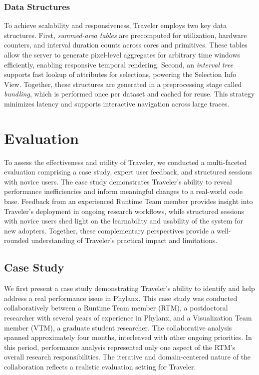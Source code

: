 \begin{refsection}
\subsubsection{Data Structures}

To achieve scalability and responsiveness, Traveler employs two key data structures. First, {\em summed-area tables} are precomputed for utilization, hardware counters, and interval duration counts across cores and primitives. These tables allow the server to generate pixel-level aggregates for arbitrary time windows efficiently, enabling responsive temporal rendering. Second, an {\em interval tree} supports fast lookup of attributes for selections, powering the Selection Info View. Together, these structures are generated in a preprocessing stage called {\em bundling}, which is performed once per dataset and cached for reuse. This strategy minimizes latency and supports interactive navigation across large traces.


\section{Evaluation}
\label{sec:travevaluation}

To assess the effectiveness and utility of Traveler, we conducted a multi-faceted evaluation comprising a case study, expert user feedback, and structured sessions with novice users. The case study demonstrates Traveler's ability to reveal performance inefficiencies and inform meaningful changes to a real-world code base. Feedback from an experienced Runtime Team member provides insight into Traveler's deployment in ongoing research workflows, while structured sessions with novice users shed light on the learnability and usability of the system for new adopters. Together, these complementary perspectives provide a well-rounded understanding of Traveler's practical impact and limitations.

\subsection{Case Study}
\label{subsec:casestudy}

We first present a case study demonstrating Traveler's ability to identify and help address a real performance issue in Phylanx. This case study was conducted collaboratively between a Runtime Team member (RTM), a postdoctoral researcher with several years of experience in Phylanx, and a Visualization Team member (VTM), a graduate student researcher. The collaborative analysis spanned approximately four months, interleaved with other ongoing priorities. In this period, performance analysis represented only one aspect of the RTM's overall research responsibilities. The iterative and domain-centered nature of the collaboration reflects a realistic evaluation setting for Traveler.


\end{refsection}
